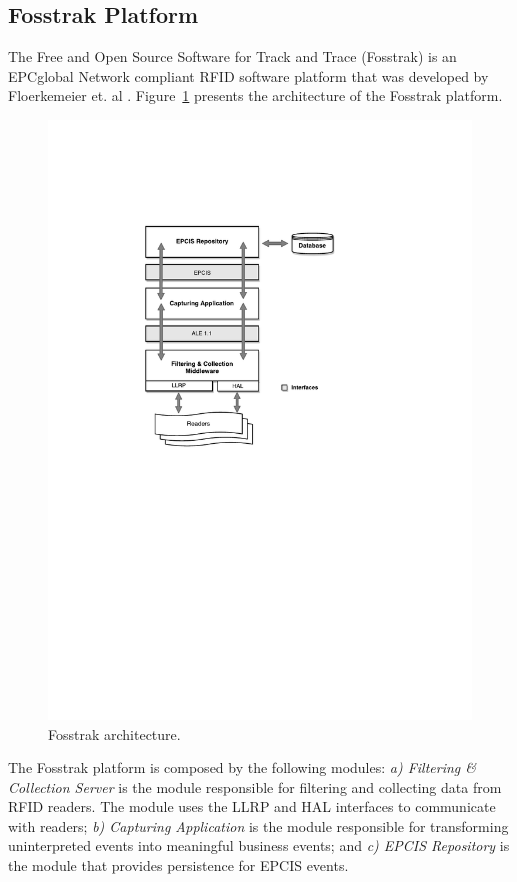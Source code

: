 \subsection{Fosstrak Platform}
\label{sub:fosstrak}
The Free and Open Source Software for Track and Trace (Fosstrak) is an EPCglobal Network compliant
\gls{RFID} software platform that was developed by Floerkemeier et. al \cite{floerkemeier2007rfid}.
Figure~\ref{fig:fosstrak_architecture} presents the architecture of the Fosstrak platform.\\

\begin{figure}[ht!]
  \centering
  \includegraphics[width=.45\textwidth]{./figures/fosstrak_architecture}
  \caption[Fosstrak architecture.]{Fosstrak architecture.}
  \label{fig:fosstrak_architecture}
\end{figure}

The Fosstrak platform is composed by the following modules: \textit{a) Filtering \& Collection Server}
is the module responsible for filtering and collecting data from \gls{RFID} readers. The module uses the
\gls{LLRP} and \gls{HAL} interfaces to communicate with readers; \textit{b) Capturing Application} is
the module responsible for transforming uninterpreted events into meaningful business events; and
\textit{c) EPCIS Repository} is the module that provides persistence for \gls{EPCIS} events.
